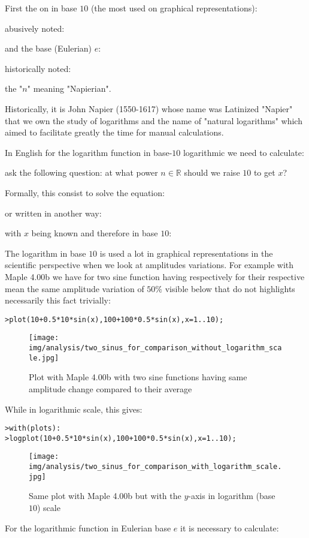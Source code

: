 	First the on in base $10$ (the most used on graphical representations):
	
	abusively noted:
	
	and the base (Eulerian) $e$:
	
	historically noted:
	
	the "$n$" meaning "Napierian".
	
	\begin{tcolorbox}[title=Remark,colframe=black,arc=10pt]
	Historically, it is John Napier (1550-1617) whose name was Latinized "Napier" that we own the study of logarithms and the name of "natural logarithms" which aimed to facilitate greatly the time for manual calculations.
	\end{tcolorbox}
	In English for the logarithm function in base-$10$ logarithmic we need to calculate:
	
	ask the following question: at what power $n\in \mathbb{R}$ should we raise $10$ to get $x$?
	
	Formally, this consist to solve the equation:
	
	or written in another way:
	
	with $x$ being known and therefore in base $10$:
	
	The logarithm in base $10$ is used a lot in graphical representations in the scientific perspective when we look at amplitudes variations. For example with Maple 4.00b  we have for two sine function  having respectively for their respective mean the same amplitude variation of $50\%$ visible below that do not highlights necessarily this fact trivially:
	
	\texttt{>plot({10+0.5*10*sin(x),100+100*0.5*sin(x)},x=1..10);}
	
	\begin{figure}[H]
		\centering
		\texttt{[image: img/analysis/two\_sinus\_for\_comparison\_without\_logarithm\_scale.jpg]}
		\caption[]{Plot with Maple 4.00b with two sine functions having same amplitude change compared to their average}
	\end{figure}
	While in logarithmic scale, this gives:
	
	\texttt{>with(plots):\\
	>logplot({10+0.5*10*sin(x),100+100*0.5*sin(x)},x=1..10);}
	
	\begin{figure}[H]
		\centering
		\texttt{[image: img/analysis/two\_sinus\_for\_comparison\_with\_logarithm\_scale.jpg]}
		\caption[]{Same plot with Maple 4.00b but with the $y$-axis in logarithm (base $10$) scale}
	\end{figure}
	For the logarithmic function in Eulerian base $e$ it is necessary to calculate:
	
